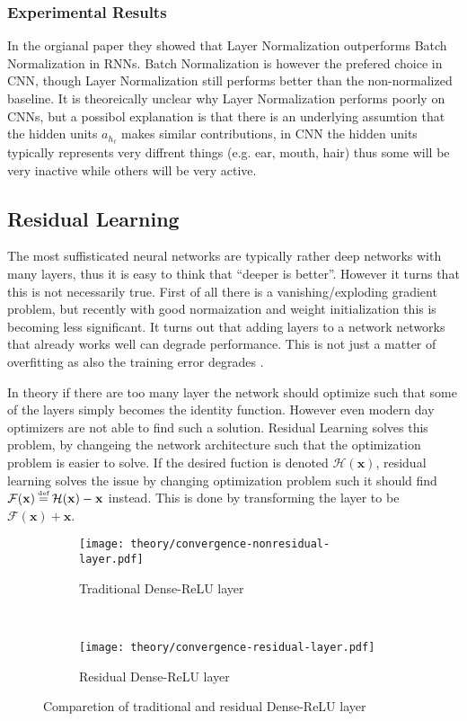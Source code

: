\subsubsection{Experimental Results}

In the orgianal paper \cite{layer-normalization} they showed that Layer Normalization outperforms Batch Normalization in RNNs. Batch Normalization is however the prefered choice in CNN, though Layer Normalization still performs better than the non-normalized baseline. It is theoreically unclear why Layer Normalization performs poorly on CNNs, but a possibol explanation is that there is an underlying assumtion that the hidden units $a_{h_\ell}$ makes similar contributions, in CNN the hidden units typically represents very diffrent things (e.g. ear, mouth, hair) thus some will be very inactive while others will be very active.

\clearpage
\subsection{Residual Learning}

The most suffisticated neural networks are typically rather deep networks with many layers, thus it is easy to think that ``deeper is better''. However it turns that this is not necessarily true. First of all there is a vanishing/exploding gradient problem, but recently with good normaization and weight initialization this is becoming less significant. It turns out that adding layers to a network networks that already works well can degrade performance. This is not just a matter of overfitting as also the training error degrades \cite{residual-learning}.

In theory if there are too many layer the network should optimize such that some of the layers simply becomes the identity function. However even modern day optimizers are not able to find such a solution. Residual Learning solves this problem, by changeing the network architecture such that the optimization problem is easier to solve. If the desired fuction is denoted $\mathcal{H}(\mathbf{x})$, residual learning solves the issue by changing optimization problem such it should find $\mathcal{F}(\mathbf{x}) \defeq \mathcal{H}(\mathbf{x}) - \mathbf{x}$ instead. This is done by transforming the layer to be $\mathcal{F}(\mathbf{x}) + \mathbf{x}$.

\begin{figure}[H]
    \centering
    \begin{subfigure}[b]{0.4\textwidth}
        \centering
        \texttt{[image: theory/convergence-nonresidual-layer.pdf]}
        \caption{Traditional Dense-ReLU layer}
    \end{subfigure}
    ~ %
    \begin{subfigure}[b]{0.4\textwidth}
        \centering
        \texttt{[image: theory/convergence-residual-layer.pdf]}
        \caption{Residual Dense-ReLU layer}
    \end{subfigure}
    \caption{Comparetion of traditional and residual Dense-ReLU layer}
\end{figure}

